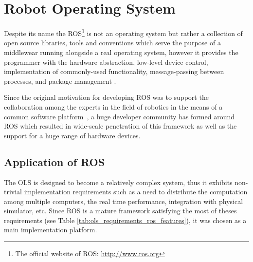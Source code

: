 \section{Robot Operating System} \label{txt:robot_operating_system}

Despite its name the ROS\footnote{The official website of ROS: \url{http://www.ros.org}} is not an operating system but rather a collection of open source libraries, tools and conventions which serve the purpose of a middlewear running alongside a real operating system, however it provides the programmer with the hardware abstraction,  low-level device control, implementation of commonly-used functionality,
message-passing between processes, and package management \cite{O'Kane201310}.

Since the original motivation for developing ROS was to support the collaboration among the experts in the field of robotics in the means of a common software platform~\cite{ROS-an-open-source-Robot-Operating-System}, a huge developer community has formed around ROS which resulted in wide-scale penetration of this framework as well as the support for a huge range of hardware devices.

\subsection{Application of ROS}

The OLS is designed to become a relatively complex system, thus it exhibits non-trivial implementation requirements such as a need to distribute the computation among multiple computers, the real time performance, integration with physical simulator, etc. Since ROS is a mature framework satisfying the most of theses requirements (see Table \ref{tab:ols_requirements_ros_features}), it was chosen as a main implementation platform.



